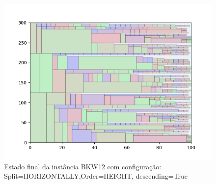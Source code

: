 \begin{figure}[H]
    \centering
    \caption[]{Estado final da instância BKW12 com configuração: Split=HORIZONTALLY,Order=HEIGHT, descending=True}
    \label{fig:bkw12-horizontally-height-true}
    \includegraphics[scale=0.5]{output/figures/bkw/bkw12/horizontally/height/true/000}
\end{figure}